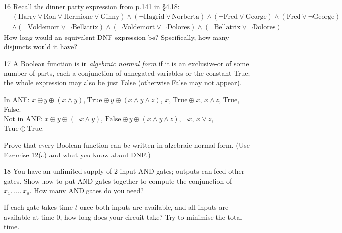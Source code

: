 \begin{exercise}{16}
    Recall the dinner party expression from p.141 in \S4.18:
    \begin{align*}
        &(\mathrm{Harry}\vee\mathrm{Ron}\vee\mathrm{Hermione}\vee\mathrm{Ginny})
        \wedge(\neg\mathrm{Hagrid}\vee\mathrm{Norberta})
        \wedge(\neg\mathrm{Fred}\vee\mathrm{George})\wedge(\mathrm{Fred}\vee\neg\mathrm{George})\\
        &\wedge(\neg\mathrm{Voldemort}\vee\neg\mathrm{Bellatrix})
        \wedge(\neg\mathrm{Voldemort}\vee\neg\mathrm{Dolores})
        \wedge(\neg\mathrm{Bellatrix}\vee\neg\mathrm{Dolores})
    \end{align*}
    How long would an equivalent DNF expression be? Specifically, how many
    disjuncts would it have?
\end{exercise}

\begin{exercise}{17}
    A Boolean function is in \emph{algebraic normal form} if it is an
    exclusive-or of some number of parts, each a conjunction of unnegated
    variables or the constant True; the whole expression may also be just False
    (otherwise False may not appear).

    In ANF: $x\oplus y\oplus(x\wedge y)$, $\mathrm{True}\oplus y\oplus(x\wedge
    y\wedge z)$, $x$, $\mathrm{True}\oplus x$, $x\wedge z$, True, False.\\
    Not in ANF: $x\oplus y\oplus(\neg x\wedge y)$, $\mathrm{False}\oplus y\oplus
    (x\wedge y\wedge z)$, $\neg x$, $x\vee z$, $\mathrm{True}\oplus\mathrm{True}$.

    Prove that every Boolean function can be written in algebraic normal form.
    (Use Exercise 12(a) and what you know about DNF.)
\end{exercise}

\begin{exercise}{18}
    You have an unlimited supply of 2-input AND gates; outputs can feed other
    gates. Show how to put AND gates together to compute the conjunction of
    $x_1,\dots,x_8$. How many AND gates do you need?

    If each gate takes time $t$ once both inputs are available, and all inputs
    are available at time 0, how long does your circuit take? Try to minimise the
    total time.
\end{exercise}

